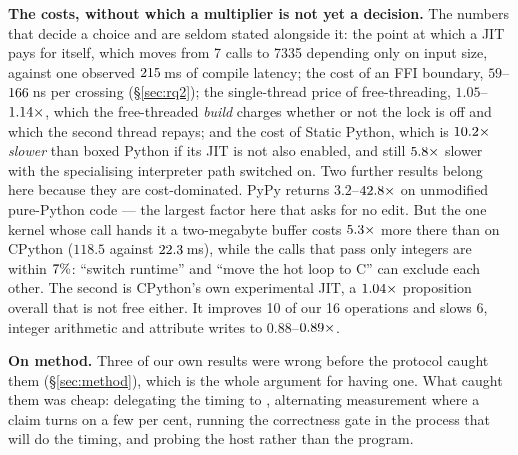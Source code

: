 \textbf{The costs, without which a multiplier is not yet a decision.} The numbers that decide a
choice and are seldom stated alongside it: the point at which a JIT pays for itself, which moves from 7 calls to 7335
depending only on input size, against one observed $\meas{fact:b1_breakeven-314:facts.numba_compile_s:ms}{215}$\,ms of compile latency; the cost of
an FFI boundary, $59$--$\meas{med:b1_compute-314:call_overhead/c_ctypes:ns}{166}$\,ns per crossing (\S\ref{sec:rq2}); the single-thread price of free-threading,
$1.05$--$\meas{ratio:b4_threads-ft:single_thread_arith/ft|b4_threads-gil:single_thread_arith/gil}{1.14}\times$, which the free-threaded \emph{build} charges whether or not the lock is
off and which the second thread repays; and the cost of Static Python, which is
$\meas{ratio:b6_static-fork_static:matmul96_int/fork_static/static_interp|b6_static-fork_static:matmul96_int/fork_static/boxed_python}{10.2}\times$ \emph{slower} than boxed Python if its JIT is not also enabled, and still
$\meas{ratio:b6_static-fork_static_adaptive:matmul96_int/fork_static_adaptive/static_interp|b6_static-fork_static_adaptive:matmul96_int/fork_static_adaptive/boxed_python}{5.8}\times$ slower with the specialising interpreter path switched on. Two further results
belong here because they are cost-dominated. PyPy returns $3.2$--$\meas{ratio:b1_compute-314:matmul/cpython_loop|b1_compute-pypy311:matmul/cpython_loop}{42.8}\times$ on unmodified
pure-Python code --- the largest factor here that asks for no edit. But the one kernel whose
 call hands it a two-megabyte buffer costs $\meas{ratio:b2_branchy-pypy311:tokenize/c_ctypes|b2_branchy-314:tokenize/c_ctypes}{5.3}\times$ more there than on CPython
($118.5$ against $\meas{med:b2_branchy-314:tokenize/c_ctypes:ms}{22.3}$\,ms), while the calls that pass only integers are within $\meas{pct:b2_branchy-314:binarytrees/rust_ctypes|b2_branchy-pypy311:binarytrees/rust_ctypes}{7}\%$:
``switch runtime'' and ``move the hot loop to C'' can exclude each other. The second is CPython's
own experimental JIT, a $\meas{geomean:b5_buildcfg-plain|b5_buildcfg-jit}{1.04}\times$ proposition overall that is not free either. It improves 10
of our 16 operations and slows 6, integer arithmetic and attribute writes to $0.88$--$\meas{ratio:b5_buildcfg-plain:int_arith/plain|b5_buildcfg-jit:int_arith/jit}{0.89}\times$.

\textbf{On method.} Three of our own results were wrong before the protocol caught them
(\S\ref{sec:method}), which is the whole argument for having one. What caught them was cheap:
delegating the timing to , alternating measurement where a claim turns on a few per
cent, running the correctness gate in the process that will do the timing, and probing the host
rather than the program.

